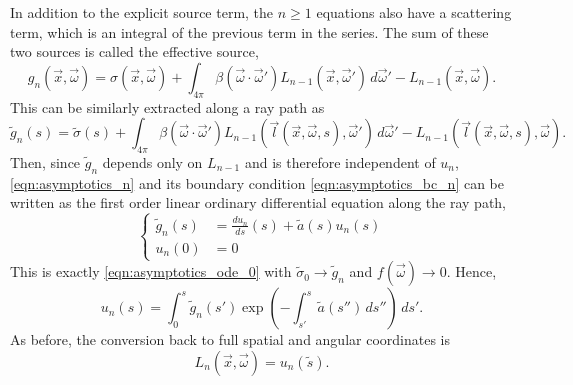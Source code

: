 In addition to the explicit source term, the  $n \geq 1$ equations also have a scattering term, which is an integral of the previous term in the series. The sum of these two sources is called the effective source,
\begin{equation*}
  g_n(\vec{x}, \vec{\omega}) = \sigma(\vec{x}, \vec{\omega}) + \int_{4\pi} \beta(\vec{\omega}\cdot\vec{\omega}')
  L_{n-1}(\vec{x}, \vec{\omega}')\,d\vec{\omega}' - L_{n-1}(\vec{x}, \vec{\omega}).
\end{equation*}
This can be similarly extracted along a ray path as
\begin{equation*}
  \tilde{g}_n(s) = \tilde{\sigma}(s) + \int_{4\pi} \beta(\vec{\omega}\cdot\vec{\omega}')
  L_{n-1}(\vec{l}(\vec{x}, \vec{\omega}, s), \vec{\omega}')\,d\vec{\omega}' - L_{n-1}(\vec{l}(\vec{x}, \vec{\omega}, s), \vec{\omega}).
\end{equation*}
Then, since $\tilde{g}_n$ depends only on $L_{n-1}$ and is therefore independent of $u_n$, \eqref{eqn:asymptotics_n} and its boundary condition \eqref{eqn:asymptotics_bc_n} can be written as the first order linear ordinary differential equation along the ray path,
\begin{equation}
  \left\{
  \begin{aligned}
    \tilde{g}_n(s) &= \frac{du_n}{ds}(s) + \tilde{a}(s)u_n(s) \\
    u_n(0) &= 0
  \end{aligned}
  \right.
  \label{eqn:asymptotics_ode_n}
\end{equation}
This is exactly \eqref{eqn:asymptotics_ode_0} with $\tilde{\sigma}_0 \to \tilde{g}_n$ and $f(\vec{\omega}) \to 0$.
Hence,
\begin{equation}
  u_n(s) = \int_0^s\tilde{g}_n(s')\exp\left( -\int_{s'}^{s}\tilde{a}(s'')\,ds'' \right)\, ds'.
  \label{eqn:asymptotics_soln_n}
\end{equation}
As before, the conversion back to full spatial and angular coordinates is
\begin{equation*}
  L_n(\vec{x}, \vec{\omega}) = u_n(\tilde{s}).
\end{equation*}
